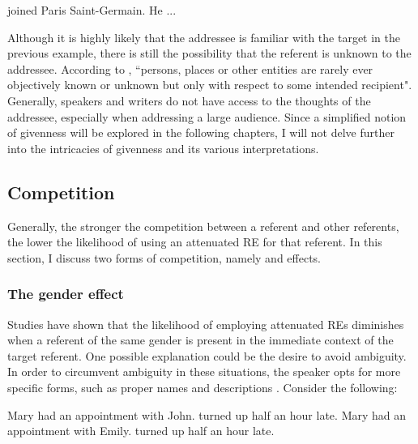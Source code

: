 \begin{exe}
	\ex {} joined Paris Saint-Germain. He ... \label{ex:messi}
\end{exe}

Although it is highly likely that the addressee is familiar with the target in the previous example, there is still the possibility that the referent is unknown to the addressee. According to \citet[127]{Baumann2012}, ``persons, places or other entities are rarely ever objectively known or unknown but only with respect to some intended recipient". Generally, speakers and writers do not have access to the thoughts of the addressee, especially when addressing a large audience. Since a simplified notion of givenness will be explored in the following chapters, I will not delve further into the intricacies of givenness and its various interpretations.

\subsection{Competition}\label{subsec:competition}
Generally, the stronger the competition between a referent and other referents, the lower the likelihood of using an attenuated RE for that referent. In this section, I discuss two forms of competition, namely  and  effects.

\subsubsection{The gender effect} 
Studies have shown that the likelihood of employing attenuated REs diminishes when a referent of the same gender is present in the immediate context of the target referent. One possible explanation could be the desire to avoid ambiguity. In order to circumvent ambiguity in these situations, the speaker opts for more specific forms, such as proper names and descriptions \citep{Karmiloffsmith1985,arnold2007effect,Fukumura2013,rosa2015semantic}. Consider the following:

\begin{exe}
	\ex 
	\begin{xlist}
		\ex Mary had an appointment with John.  turned up half an hour late. \label{ex:gender1}
		\ex\label{ex:gender2} Mary had an appointment with Emily.  turned up half an hour late. 
	\end{xlist}
\end{exe}

